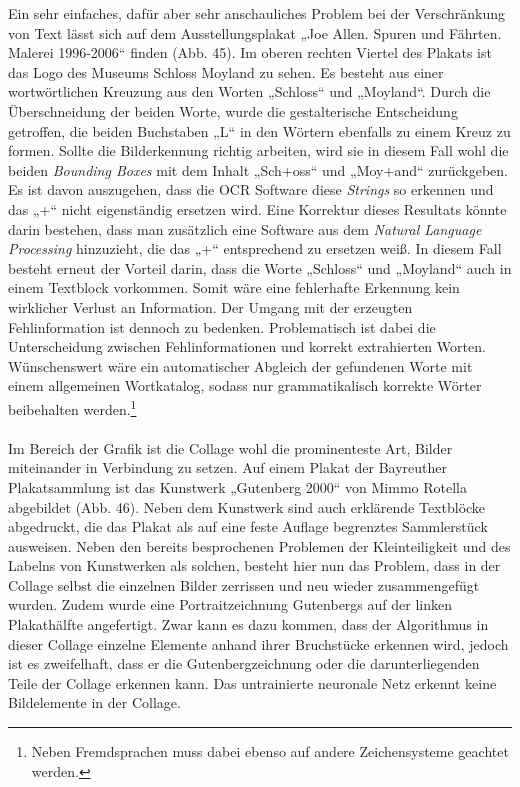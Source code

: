 \documentclass[a4paper,12pt,ngerman]{article}
\begin{document}
Ein sehr einfaches, dafür aber sehr anschauliches Problem bei der Verschränkung von Text lässt sich auf dem Ausstellungsplakat „Joe Allen. Spuren und Fährten. Malerei 1996-2006“ finden (Abb. 45). Im oberen rechten Viertel des Plakats ist das Logo des Museums Schloss Moyland zu sehen. Es besteht aus einer wortwörtlichen Kreuzung aus den Worten „Schloss“ und „Moyland“. Durch die Überschneidung der beiden Worte, wurde die gestalterische Entscheidung getroffen, die beiden Buchstaben „L“ in den Wörtern ebenfalls zu einem Kreuz zu formen. Sollte die Bilderkennung richtig arbeiten, wird sie in diesem Fall wohl die beiden \textit{Bounding Boxes} mit dem Inhalt „Sch+oss“ und „Moy+and“ zurückgeben. Es ist davon auszugehen, dass die OCR Software diese \textit{Strings} so erkennen und das „+“ nicht eigenständig ersetzen wird. Eine Korrektur dieses Resultats könnte darin bestehen, dass man zusätzlich eine Software aus dem \textit{Natural Language Processing} hinzuzieht, die das „+“ entsprechend zu ersetzen weiß. In diesem Fall besteht erneut der Vorteil darin, dass die Worte „Schloss“ und „Moyland“ auch in einem Textblock vorkommen. Somit wäre eine fehlerhafte Erkennung kein wirklicher Verlust an Information. Der Umgang mit der erzeugten Fehlinformation ist dennoch zu bedenken. Problematisch ist dabei die Unterscheidung zwischen Fehlinformationen und korrekt extrahierten Worten. Wünschenswert wäre ein automatischer Abgleich der gefundenen Worte mit einem allgemeinen Wortkatalog, sodass nur grammatikalisch korrekte Wörter beibehalten werden.\footnote{Neben Fremdsprachen muss dabei ebenso auf andere Zeichensysteme geachtet werden.} \\
\\
Im Bereich der Grafik ist die Collage wohl die prominenteste Art, Bilder miteinander in Verbindung zu setzen. Auf einem Plakat der Bayreuther Plakatsammlung ist das Kunstwerk „Gutenberg 2000“ von Mimmo Rotella abgebildet (Abb. 46). Neben dem Kunstwerk sind auch erklärende Textblöcke abgedruckt, die das Plakat als auf eine feste Auflage begrenztes Sammlerstück ausweisen. Neben den bereits besprochenen Problemen der Kleinteiligkeit und des Labelns von Kunstwerken als solchen, besteht hier nun das Problem, dass in der Collage selbst die einzelnen Bilder zerrissen und neu wieder zusammengefügt wurden. Zudem wurde eine Portraitzeichnung Gutenbergs auf der linken Plakathälfte angefertigt. Zwar kann es dazu kommen, dass der Algorithmus in dieser Collage einzelne Elemente anhand ihrer Bruchstücke erkennen wird, jedoch ist es zweifelhaft, dass er die Gutenbergzeichnung oder die darunterliegenden Teile der Collage erkennen kann. Das untrainierte neuronale Netz erkennt keine Bildelemente in der Collage.\\
\end{document}
